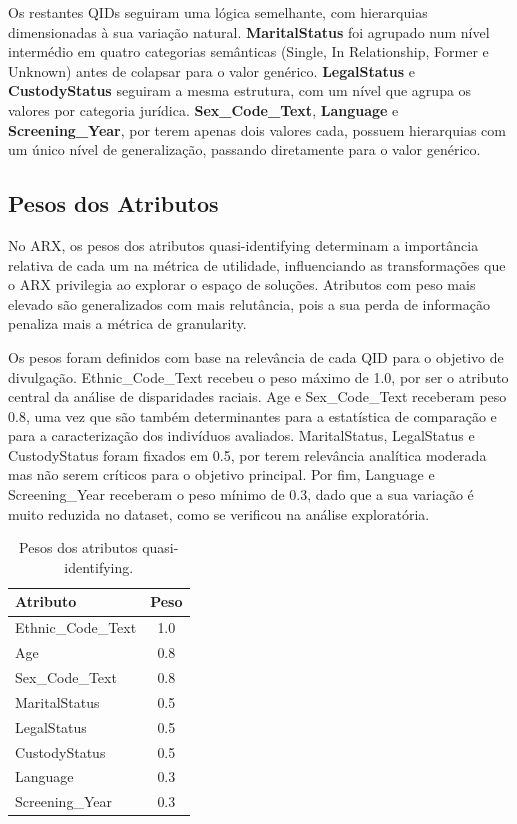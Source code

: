 Os restantes QIDs seguiram uma lógica semelhante, com hierarquias dimensionadas à sua variação natural. \textbf{MaritalStatus} foi agrupado num nível intermédio em quatro categorias semânticas (Single, In Relationship, Former e Unknown) antes de colapsar para o valor genérico. \textbf{LegalStatus} e \textbf{CustodyStatus} seguiram a mesma estrutura, com um nível que agrupa os valores por categoria jurídica. \textbf{Sex\_Code\_Text}, \textbf{Language} e \textbf{Screening\_Year}, por terem apenas dois valores cada, possuem hierarquias com um único nível de generalização, passando diretamente para o valor genérico.

\subsection{Pesos dos Atributos}
\label{sec:pesos}

No ARX, os pesos dos atributos quasi-identifying determinam a importância relativa de cada um na métrica de utilidade, influenciando as transformações que o ARX privilegia ao explorar o espaço de soluções. Atributos com peso mais elevado são generalizados com mais relutância, pois a sua perda de informação penaliza mais a métrica de granularity.

Os pesos foram definidos com base na relevância de cada QID para o objetivo de divulgação. Ethnic\_Code\_Text recebeu o peso máximo de 1.0, por ser o atributo central da análise de disparidades raciais. Age e Sex\_Code\_Text receberam peso 0.8, uma vez que são também determinantes para a estatística de comparação e para a caracterização dos indivíduos avaliados. MaritalStatus, LegalStatus e CustodyStatus foram fixados em 0.5, por terem relevância analítica moderada mas não serem críticos para o objetivo principal. Por fim, Language e Screening\_Year receberam o peso mínimo de 0.3, dado que a sua variação é muito reduzida no dataset, como se verificou na análise exploratória.

\begin{table}[H]
\centering
\caption{Pesos dos atributos quasi-identifying.}
\label{tab:pesos}
\begin{tabular}{lc}
\toprule
\textbf{Atributo} & \textbf{Peso} \\
\midrule
Ethnic\_Code\_Text & 1.0 \\
Age & 0.8 \\
Sex\_Code\_Text & 0.8 \\
MaritalStatus & 0.5 \\
LegalStatus & 0.5 \\
CustodyStatus & 0.5 \\
Language & 0.3 \\
Screening\_Year & 0.3 \\
\bottomrule
\end{tabular}
\end{table}


